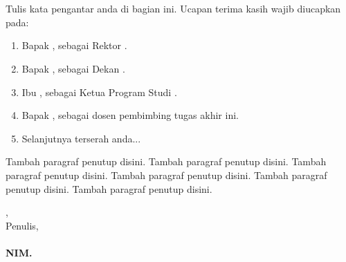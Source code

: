 %
%
%
%

\chapter*{\kataPengantar}
Tulis kata pengantar anda di bagian ini. Ucapan terima kasih wajib diucapkan pada:
\begin{enumerate}
	\item Bapak \rektor, sebagai Rektor \universitas. 
	\item Bapak \dekan, sebagai Dekan \fakultas. 
	\item Ibu \kaprodi, sebagai Ketua Program Studi \programStudi.
	\item Bapak \pembimbingpertama, sebagai dosen pembimbing tugas akhir ini.
	\item Selanjutnya terserah anda...
\end{enumerate}


Tambah paragraf penutup disini. Tambah paragraf penutup disini. Tambah paragraf penutup disini.
Tambah paragraf penutup disini. Tambah paragraf penutup disini. Tambah paragraf penutup disini.

\vspace*{0.1cm}

\begin{flushright}
\kota, \tanggalPersetujuan\\
Penulis,\\
\vspace{2cm}
\textbf{\underline{\penulis}\\
NIM. \nim}

\end{flushright}
